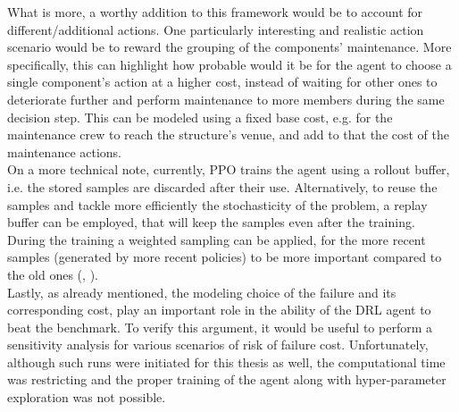 What is more, a worthy addition to this framework would be to account for different/additional actions. One particularly interesting and realistic action scenario would be to reward the grouping of the components' maintenance. More specifically, this can highlight how probable would it be for the agent to choose a single component's action at a higher cost, instead of waiting for other ones to deteriorate further and perform maintenance to more members during the same decision step. This can be modeled using a fixed base cost, e.g. for the maintenance crew to reach the structure's venue, and add to that the cost of the maintenance actions.\\

On a more technical note, currently, \gls{PPO} trains the agent using a rollout buffer, i.e. the stored samples are discarded after their use. Alternatively, to reuse the samples and tackle more efficiently the stochasticity of the problem, a replay buffer can be employed, that will keep the samples even after the training. During the training a weighted sampling can be applied, for the more recent samples (generated by more recent policies) to be more important compared to the old ones (\cite{wang2016sample}, \cite{andriotis2019managing}).\\

Lastly, as already mentioned, the modeling choice of the failure and its corresponding cost, play an important role in the ability of the \gls{DRL} agent to beat the benchmark. To verify this argument, it would be useful to perform a sensitivity analysis for various scenarios of risk of failure cost. Unfortunately, although such runs were initiated for this thesis as well, the computational time was restricting and the proper training of the agent along with hyper-parameter exploration was not possible.


